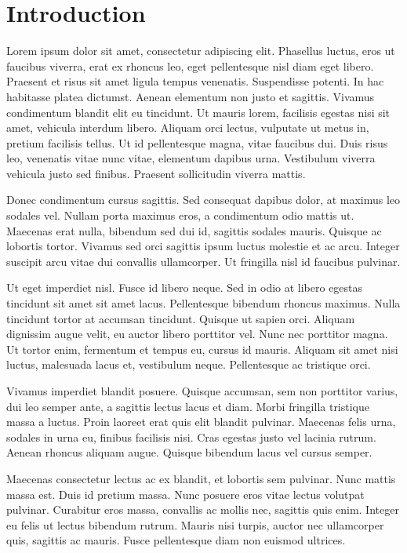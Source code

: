 \chapter{Introduction}
Lorem ipsum dolor sit amet, consectetur adipiscing elit. Phasellus luctus, eros ut faucibus viverra, erat ex rhoncus leo, eget pellentesque nisl diam eget libero. Praesent et risus sit amet ligula tempus venenatis. Suspendisse potenti. In hac habitasse platea dictumst. Aenean elementum non justo et sagittis. Vivamus condimentum blandit elit eu tincidunt. Ut mauris lorem, facilisis egestas nisi sit amet, vehicula interdum libero. Aliquam orci lectus, vulputate ut metus in, pretium facilisis tellus. Ut id pellentesque magna, vitae faucibus dui. Duis risus leo, venenatis vitae nunc vitae, elementum dapibus urna. Vestibulum viverra vehicula justo sed finibus. Praesent sollicitudin viverra mattis.

Donec condimentum cursus sagittis. Sed consequat dapibus dolor, at maximus leo sodales vel. Nullam porta maximus eros, a condimentum odio mattis ut. Maecenas erat nulla, bibendum sed dui id, sagittis sodales mauris. Quisque ac lobortis tortor. Vivamus sed orci sagittis ipsum luctus molestie et ac arcu. Integer suscipit arcu vitae dui convallis ullamcorper. Ut fringilla nisl id faucibus pulvinar.

Ut eget imperdiet nisl. Fusce id libero neque. Sed in odio at libero egestas tincidunt sit amet sit amet lacus. Pellentesque bibendum rhoncus maximus. Nulla tincidunt tortor at accumsan tincidunt. Quisque ut sapien orci. Aliquam dignissim augue velit, eu auctor libero porttitor vel. Nunc nec porttitor magna. Ut tortor enim, fermentum et tempus eu, cursus id mauris. Aliquam sit amet nisi luctus, malesuada lacus et, vestibulum neque. Pellentesque ac tristique orci.

Vivamus imperdiet blandit posuere. Quisque accumsan, sem non porttitor varius, dui leo semper ante, a sagittis lectus lacus et diam. Morbi fringilla tristique massa a luctus. Proin laoreet erat quis elit blandit pulvinar. Maecenas felis urna, sodales in urna eu, finibus facilisis nisi. Cras egestas justo vel lacinia rutrum. Aenean rhoncus aliquam augue. Quisque bibendum lacus vel cursus semper.

Maecenas consectetur lectus ac ex blandit, et lobortis sem pulvinar. Nunc mattis massa est. Duis id pretium massa. Nunc posuere eros vitae lectus volutpat pulvinar. Curabitur eros massa, convallis ac mollis nec, sagittis quis enim. Integer eu felis ut lectus bibendum rutrum. Mauris nisi turpis, auctor nec ullamcorper quis, sagittis ac mauris. Fusce pellentesque diam non euismod ultrices. 


